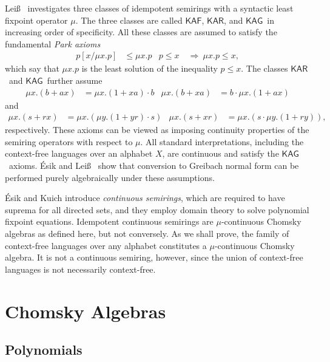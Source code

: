 \documentclass[copyright,creativecommons]{eptcs}
\theoremstyle{remark}
\newcommand\subst[2]{[#1/#2]}
\newcommand\Imp{\mathrel\Rightarrow}
\newcommand\mathname[1]{\ensuremath{\mathsf{#1}}}
\newcommand\KAF{\mathname{KAF}}
\newcommand\KAR{\mathname{KAR}}
\newcommand\KAG{\mathname{KAG}}
\begin{document}
Lei\ss\ \cite{leiss92b} investigates three classes of idempotent semirings with a syntactic least fixpoint operator $\mu$. The three classes are called \KAF, \KAR, and \KAG\ in increasing order of specificity. All these classes are assumed to satisfy the fundamental \emph{Park axioms}
\begin{align*}
p\subst x{\mu x.p} &\leq \mu x.p & p \leq x\ &\Imp\ \mu x.p \leq x, 
\end{align*}
which say that $\mu x.p$ is the least solution of the inequality $p \leq x$. The classes \KAR\ and \KAG\ further assume
\begin{align*}
\mu x.(b + ax) &= \mu x.(1 + xa)\cdot b & \mu x.(b + xa) &= b\cdot\mu x.(1 + ax)
\end{align*}
and
\begin{align*}
\mu x.(s + rx) &= \mu x.(\mu y.(1 + yr)\cdot s) & \mu x.(s + xr) &= \mu x.(s\cdot \mu y.(1 + ry)),
\end{align*}
respectively. These axioms can be viewed as imposing continuity properties of the semiring operators with respect to $\mu$. All standard interpretations, including the context-free languages over an alphabet $X$, are continuous and satisfy the \KAG\ axioms. \'Esik and Lei\ss\ \cite{esle2002,EsikLeiss05} show that conversion to Greibach normal form can be performed purely algebraically under these assumptions.

\'Esik and Kuich \cite{esik2007modern} introduce \emph{continuous semirings}, which are required to have suprema for all directed sets, and they
employ domain theory to solve polynomial fixpoint equations.  Idempotent  continuous semirings are $\mu$-continuous Chomsky algebras as 
defined here, but not conversely.  As we shall prove, the family of context-free languages over any alphabet constitutes a $\mu$-continuous Chomsky algebra.  It is not a continuous semiring, however, since the union of context-free languages is not necessarily context-free.   

\section{Chomsky Algebras}
\label{sec:CF}

\subsection{Polynomials}
\end{document}
